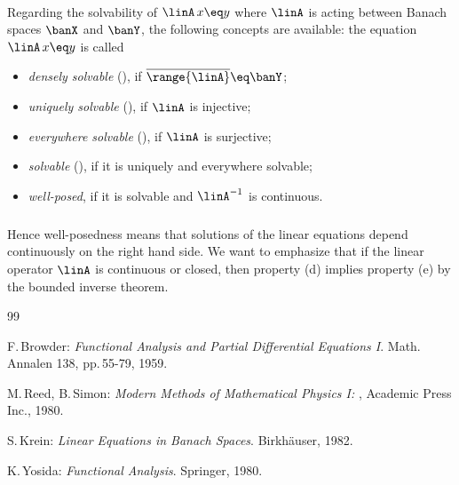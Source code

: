 \documentclass[11pt,twoside]{article}
\begin{document}
\paragraph{} %
Regarding the solvability of $\linA \, x \eq y$
where $\linA$ is acting between Banach spaces $\banX$ and $\banY$,
the following concepts are available:
the equation $\linA \, x \eq y$ is called

\begin{itemize}[leftmargin=12mm]
\item[(a)]
\textit{densely solvable} (\cite{II_Kr}),
if $\overline{\range{\linA}} \eq \banY$;

\item[(b)]
\textit{uniquely solvable} (\cite{II_Kr}),
if $\linA$ is injective;

\item[(c)]
\textit{everywhere solvable} (\cite{II_Kr}),
if $\linA$ is surjective;

\item[(d)]
\textit{solvable} (\cite{II_Br}),
if it is uniquely and everywhere solvable;

\item[(e)]
\textit{well-posed},
if it is solvable and $\linA^{-1}$ is continuous.
\end{itemize}

\subparagraph{}
Hence well-posedness means that
solutions of the linear equations depend continuously on the right hand side.
We want to emphasize
that if the linear operator $\linA$ is continuous or closed,
then property (d) implies property (e) by the bounded inverse theorem.

\vspace{5mm}
\begin{thebibliography}{99}
\begin{small}

 F.\,Browder:
\textit{Functional Analysis and Partial Differential Equations I}.
Math. Annalen 138, pp.\,55-79, 1959.

 M.\,Reed, B.\,Simon:
\textit{Modern Methods of Mathematical Physics I: {\FA}},
Academic Press Inc., 1980.

 S.\,Krein:
\textit{Linear Equations in Banach Spaces}.
Birk\-h\"{a}user, 1982.

 K.\,Yosida:
\textit{Functional Analysis}.
Springer, 1980.

\end{small}
\end{thebibliography}
\end{document}
